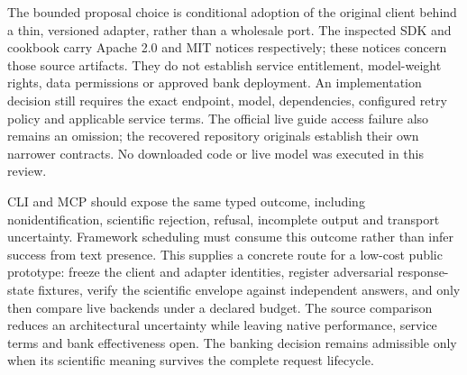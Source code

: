 The bounded proposal choice is conditional adoption of the original client behind a thin, versioned adapter,
rather than a wholesale port. The inspected SDK and cookbook carry Apache 2.0 and MIT notices respectively;
these notices concern those source artifacts. They do not establish service entitlement, model-weight rights,
data permissions or approved bank deployment. An implementation decision still requires the exact endpoint,
model, dependencies, configured retry policy and applicable service terms. The official live guide access
failure also remains an omission; the recovered repository originals establish their own narrower contracts.
No downloaded code or live model was executed in this review.\citep{exec28_oa_sdk,exec28_oa_cookbook}

CLI and MCP should expose the same typed outcome, including nonidentification, scientific rejection, refusal,
incomplete output and transport uncertainty. Framework scheduling must consume this outcome rather than infer
success from text presence. This supplies a concrete route for a low-cost public prototype: freeze the client
and adapter identities, register adversarial response-state fixtures, verify the scientific envelope against
independent answers, and only then compare live backends under a declared budget. The source comparison reduces
an architectural uncertainty while leaving native performance, service terms and bank effectiveness open.
The banking decision remains admissible only when its scientific meaning survives the complete request lifecycle.
